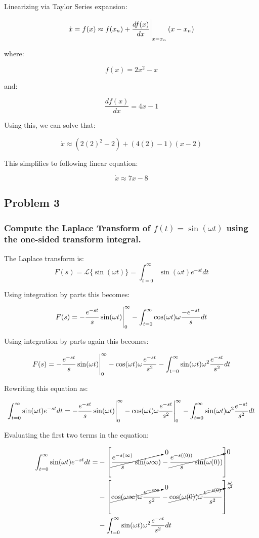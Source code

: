 \documentclass[12pt, letterpaper]{../assignment}
\begin{document}
Linearizing via Taylor Series expansion:

$$ \dot{x} = f(x) \approx f(x_n) + \eval{\frac{d f(x)}{d x}}_{x=x_n}(x-x_n)$$

where:

$$ f(x) = 2 x^2 - x $$

and:

$$ \frac{d f(x)}{d x} = 4x - 1 $$

Using this, we can solve that:

$$ \dot{x} \approx (2(2)^2 - 2) + (4(2) - 1)(x-2)$$

This simplifies to following linear equation:

\begin{answer}
$$ \dot{x} \approx 7x - 8 $$
\end{answer}

\subsection*{Problem 3}
\subsubsection*{Compute the Laplace Transform of $f(t)=\sin(\omega t)$ using the one-sided transform integral.}

The Laplace transform is:
$$ F(s) = \mathcal{L}\{\sin(\omega t)\} =
\int_{t=0}^{\infty} \sin(\omega t) e^{-st} dt  $$

Using integration by parts this becomes:

$$ F(s) = \eval{-\frac{e^{-st}}{s} \sin(\omega t)}_0^\infty -
\int_{t=0}^{\infty} \cos(\omega t) \omega \frac{-e^{-st}}{s} dt  $$

Using integration by parts again this becomes:

$$ F(s) = \eval{-\frac{e^{-st}}{s} \sin(\omega t)}_0^\infty - \cos(\omega t) \omega \frac{e^{-st}}{s^2}
- \int_{t=0}^{\infty} \sin(\omega t) \omega^2 \frac{e^{-st}}{s^2} dt  $$

Rewriting this equation as:

$$ \int_{t=0}^{\infty} \sin(\omega t) e^{-st} dt = \eval{-\frac{e^{-st}}{s} \sin(\omega t)}_0^\infty - \eval{\cos(\omega t) \omega \frac{e^{-st}}{s^2}}_0^\infty
- \int_{t=0}^{\infty} \sin(\omega t) \omega^2 \frac{e^{-st}}{s^2} dt  $$

Evaluating the first two terms in the equation:

\begin{equation*}
    \begin{aligned}
    \int_{t=0}^{\infty} \sin(\omega t) e^{-st} dt =& -\left[\cancelto{0}{\frac{e^{-s(\infty)}}{s} \sin(\omega \infty)} - \cancelto{0}{\frac{e^{-s((0))}}{s} \sin(\omega (0))} \right]\\
&- \left[\cancelto{0}{\cos(\omega \infty) \omega \frac{e^{-s\infty}}{s^2}} - \cancelto{\frac{\omega}{s^2}}{\cos(\omega (0)) \omega \frac{e^{-s(0)}}{s^2}} \right]\\
&- \int_{t=0}^{\infty} \sin(\omega t) \omega^2 \frac{e^{-st}}{s^2} dt
\end{aligned}
\end{equation*}
\end{document}
